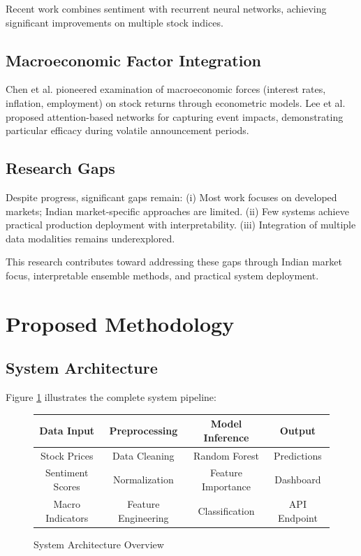 \documentclass[conference]{IEEEtran}
\begin{document}
Recent work \cite{guo2022enhancing} combines sentiment with recurrent neural networks, achieving significant improvements on multiple stock indices.

\subsection{Macroeconomic Factor Integration}

Chen et al. \cite{chen1986economic} pioneered examination of macroeconomic forces (interest rates, inflation, employment) on stock returns through econometric models. Lee et al. \cite{lee2019event} proposed attention-based networks for capturing event impacts, demonstrating particular efficacy during volatile announcement periods.

\subsection{Research Gaps}

Despite progress, significant gaps remain: (i) Most work focuses on developed markets; Indian market-specific approaches are limited. (ii) Few systems achieve practical production deployment with interpretability. (iii) Integration of multiple data modalities remains underexplored.

This research contributes toward addressing these gaps through Indian market focus, interpretable ensemble methods, and practical system deployment.

\section{Proposed Methodology}
\label{sec:methodology}

\subsection{System Architecture}

Figure \ref{fig:arch} illustrates the complete system pipeline:

\begin{figure}[!h]
\centering
\begin{tabular}{|c|c|c|c|}
\hline
\textbf{Data Input} & \textbf{Preprocessing} & \textbf{Model Inference} & \textbf{Output} \\
\hline
Stock Prices & Data Cleaning & Random Forest & Predictions \\
Sentiment Scores & Normalization & Feature Importance & Dashboard \\
Macro Indicators & Feature Engineering & Classification & API Endpoint \\
\hline
\end{tabular}
\caption{System Architecture Overview}
\label{fig:arch}
\end{figure}
\end{document}
